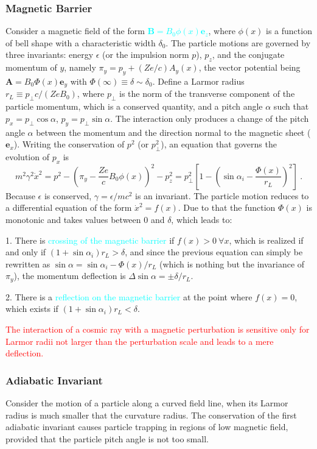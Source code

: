 \documentclass[12pt,a4paper]{article}
\renewcommand{\vec}[1]{\boldsymbol{#1}}
\begin{document}
\subsubsection{Magnetic Barrier}
Consider a magnetic field of the form \textcolor{cyan}{$\vec{B} = B_0\phi(x) \vec{e}_z$}, where $\phi(x)$ is a function of bell shape with a characteristic width $\delta_0$. The particle motions are governed by three invariants: energy $\epsilon$ (or the impulsion norm $p$), $p_z$, and the conjugate momentum of $y$, namely $\pi_y = p_y + (Ze/c)A_y(x)$, the vector potential being $\vec{A} = B_0 \Phi(x) \vec{e}_y$ with $\Phi(\infty) \equiv \delta \sim \delta_0$. Define a Larmor radius $r_L \equiv p_\perp c/(ZeB_0)$, where $p_\perp$ is the norm of the transverse component of the particle momentum, which is a conserved quantity, and a pitch angle $\alpha$ such that $p_x = p_\perp \cos \alpha$, $p_y = p_\perp \sin \alpha$. The interaction only produces a change of the pitch angle $\alpha$ between the momentum and the direction normal to the magnetic sheet ($\vec{e}_x$). Writing the conservation of $p^2$ (or $p^2_\perp$), an equation that governs the evolution of $p_x$ is
\begin{equation}
m^2 \gamma^2 \dot{x}^2 = p^2 -\left(\pi_y -\frac{Ze}{c} B_0 \phi(x) \right)^2 -p_z^2 = p^2_\perp \left[1-\left(\sin \alpha_i -\frac{\Phi(x)}{r_L} \right)^2 \right] ~.
\end{equation}
Because $\epsilon$ is conserved, $\gamma = \epsilon/mc^2$ is an invariant. The particle motion reduces to a differential equation of the form $\dot{x}^2 = f(x)$. Due to that the function $\Phi(x)$ is monotonic and takes values between $0$ and $\delta$, which leads to:

1. There is \textcolor{cyan}{crossing of the magnetic barrier} if $f(x) > 0 ~\forall x$, which is realized if and only if $(1 +\sin \alpha_i) r_L > \delta$, and since the previous equation can simply be rewritten as $\sin \alpha = \sin \alpha_i - \Phi(x)/r_L$ (which is nothing but the invariance of $\pi_y$), the momentum deflection is $\Delta \sin \alpha = \pm \delta/r_L$. 

2. There is a \textcolor{cyan}{reflection on the magnetic barrier} at the point where $f(x) = 0$, which exists if $(1+\sin \alpha_i)r_L < \delta$.

\textcolor{red}{The interaction of a cosmic ray with a magnetic perturbation is sensitive only for Larmor radii not larger than the perturbation scale and leads to a mere deflection.}

\subsubsection{Adiabatic Invariant}
Consider the motion of a particle along a curved field line, when its Larmor radius is much smaller that the curvature radius.  The conservation of the first adiabatic invariant causes particle trapping in regions of low magnetic field, provided that the particle pitch angle is not too small. 
\end{document}
